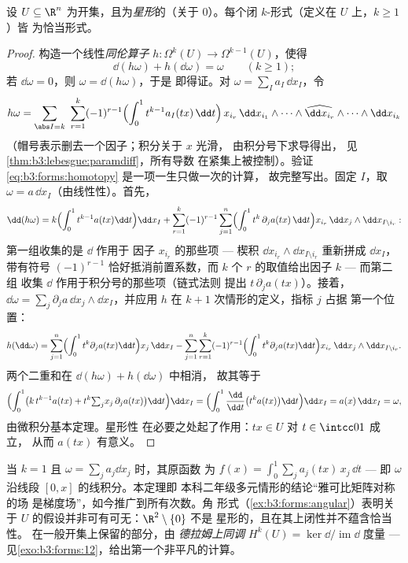 \begin{theorem}[庞加莱引理]\label{thm:b3:forms:poincare}
设 $U \subseteq \R^n$ 为开集，且为\emph{星形}的（关于
$0$）。每个闭 $k$-形式（定义在 $U$ 上，$k \geq 1$）皆
为恰当形式。
\end{theorem}

\begin{proof}
构造一个线性\emph{同伦算子} $h\colon
\Omega^k(U) \to \Omega^{k-1}(U)$，使得
\begin{equation}\label{eq:b3:forms:homotopy}
\dd(h\omega) + h(\dd\omega) = \omega
\qquad (k \geq 1);
\end{equation}
若 $\dd\omega = 0$，则 $\omega = \dd(h\omega)$，于是
即得证。对 $\omega = \sum_I a_I\,\dd x_I$，令
\[
h\omega = \sum_{\abs I = k}\ \sum_{r=1}^{k}(-1)^{r-1}
\Bigl(\int_0^1 t^{k-1}a_I(tx)\,\dd t\Bigr)\,
x_{i_r}\,\dd x_{i_1}\wedge\dots\wedge
\widehat{\dd x_{i_r}}\wedge\dots\wedge\dd x_{i_k}
\]
（帽号表示删去一个因子；积分关于 $x$ 光滑，
由积分号下求导得出，
见\cref{thm:b3:lebesgue:paramdiff}，所有导数
在紧集上被控制）。验证
\eqref{eq:b3:forms:homotopy} 是一项一生只做一次的计算，
故完整写出。固定 $I$，取 $\omega =
a\,\dd x_I$（由线性性）。首先，
\[
\dd(h\omega) = k\Bigl(\int_0^1t^{k-1}a(tx)\dd t\Bigr)\dd x_I
+ \sum_{r=1}^k(-1)^{r-1}\sum_{j=1}^n
\Bigl(\int_0^1t^{k}\,\partial_ja(tx)\,\dd t\Bigr)
x_{i_r}\,\dd x_j\wedge\dd x_{I\setminus i_r} :
\]
第一组收集的是 $\dd$ 作用于
因子 $x_{i_r}$ 的那些项 --- 楔积 $\dd x_{i_r}\wedge\dd
x_{I\setminus i_r}$ 重新拼成 $\dd x_I$，带有符号
$(-1)^{r-1}$ 恰好抵消前置系数，而 $k$ 个
$r$ 的取值给出因子 $k$ --- 而第二组
收集 $\dd$ 作用于积分号的那些项（链式法则
提出 $t\,\partial_ja(tx)$）。接着，$\dd\omega =
\sum_j\partial_ja\,\dd x_j\wedge\dd x_I$，并应用
$h$ 在 $k+1$ 次情形的定义，指标 $j$ 占据
第一个位置：
\[
h(\dd\omega) = \sum_{j=1}^n\Bigl(\int_0^1t^{k}
\partial_ja(tx)\dd t\Bigr)x_j\,\dd x_I
- \sum_{j=1}^n\sum_{r=1}^k(-1)^{r-1}
\Bigl(\int_0^1t^{k}\partial_ja(tx)\dd t\Bigr)
x_{i_r}\,\dd x_j\wedge\dd x_{I\setminus i_r} .
\]
两个二重和在 $\dd(h\omega) + h(\dd\omega)$ 中相消，
故其等于
\[
\Bigl(\int_0^1\bigl(k\,t^{k-1}a(tx) +
t^k{\textstyle\sum_j}x_j\,\partial_ja(tx)\bigr)\dd t\Bigr)
\dd x_I
= \Bigl(\int_0^1\frac{\dd}{\dd t}\bigl(t^ka(tx)\bigr)\dd
t\Bigr)\dd x_I
= a(x)\,\dd x_I = \omega,
\]
由微积分基本定理。星形性
在必要之处起了作用：$tx \in U$ 对 $t \in \intcc01$ 成立，
从而 $a(tx)$ 有意义。
\end{proof}

\begin{remark}
当 $k = 1$ 且 $\omega = \sum_j a_j\dd x_j$ 时，其原函数
为 $f(x) = \int_0^1\sum_ja_j(tx)\,x_j\,\dd t$ --- 即
$\omega$ 沿线段 $[0, x]$ 的线积分。本定理即
本科二年级多元情形的结论“雅可比矩阵对称的场
是梯度场”，如今推广到所有次数。角
形式（\cref{ex:b3:forms:angular}）表明关于
$U$ 的假设并非可有可无：$\R^2\setminus\{0\}$ 不是
星形的，且在其上闭性并不蕴含恰当性。
在一般开集上保留的部分，由
\emph{德拉姆上同调} $H^k(U) =
\ker\dd/\operatorname{im}\dd$ 度量 ---
见\cref{exo:b3:forms:12}，给出第一个非平凡的计算。
\end{remark}

